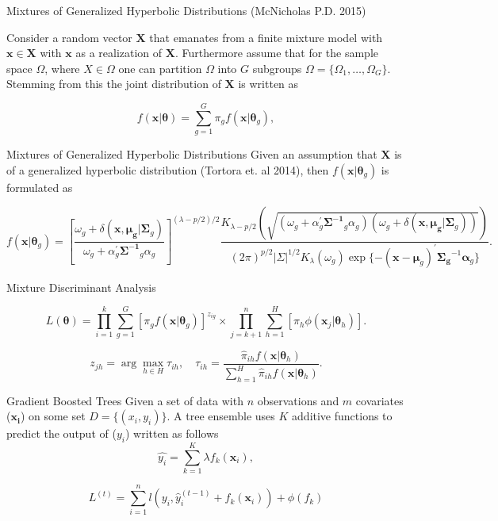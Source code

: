 \documentclass{beamer}
\begin{document}
\begin{frame}{Mixtures of Generalized Hyperbolic Distributions (McNicholas P.D. 2015) }

Consider a random vector $\bm{X}$ that emanates from a finite mixture model with $\bm{x} \in \bm{X}$ with $\bm{x}$ as a realization of $ \bm{X}$. Furthermore assume that for the sample space $\Omega$, where $X \in \Omega$ one can partition $\Omega$ into $G$ subgroups $\Omega = \{\Omega_1, \dots ,\Omega_G \}$. Stemming from this the joint distribution of $\bm{X}$ is written as

$$f(\bm{x}| \bm{\theta}) = \sum_{g = 1}^G \pi_g f(\bm{x}| \bm{\theta}_g), $$


\end{frame}


\begin{frame}{Mixtures of Generalized Hyperbolic Distributions}
Given an assumption that $\bm{X}$ is of a generalized hyperbolic distribution (Tortora et. al 2014), then $f(\bm{x}| \bm{\theta}_g)$ is formulated as 
\begin{tiny}
$$ f (\bm{x}| \bm{\theta}_g) = \left[ \frac{ \omega_g + \delta(  \bm{x}, \bm{\mu_g} | \bm{\Sigma}_g  )     }{ \omega_g +  \alpha^{'}_g \bm{\Sigma^{-1}}_g \alpha_g  }\right]^{(\lambda - p/2)/2} \frac{K_{\lambda - p/2} \left( \sqrt{ (\omega_g +  \alpha^{'}_g \bm{\Sigma^{-1}}_g \alpha_g ) (  \omega_g + \delta(  \bm{x}, \bm{\mu_g} | \bm{\Sigma}_g  ))   }    \right)    }{(2 \pi)^{p/2} |\Sigma|^{1/2} K_\lambda(\omega_g) \exp\{ - ( \bm{x} - \bm{\mu}_g)^{'} \bm{\Sigma_g}^{-1} \bm{\alpha}_g\}  } .   $$ 
\end{tiny}
\end{frame}


\begin{frame}{Mixture Discriminant Analysis}

$$L(\bm{\theta}) =   \prod_{i=1}^k \sum_{g=1}^G \left[  \pi_g f(\bm{x}| \bm{\theta}_g) \right]^{z_{ig}} \times \prod_{j=k+1}^n \sum_{h=1}^H \left[\pi_h\phi(\bm{x}_j| \bm{\theta}_h) \right].$$


$$z_{jh} = \arg \max_{h \in H} \tau_{ih}  , \quad \tau_{ih} = \frac{\hat{\pi}_{ih}  f(\bm{x}| \bm{\theta}_h)  }{ \sum_{h=1}^H \hat{\pi}_{ih}  f(\bm{x}| \bm{\theta}_h) }. $$


\end{frame}


\begin{frame}{Gradient Boosted Trees}
Given a set of data with $n$ observations and $m$ covariates ($\bm{x_i}$) on some set $D = \{ (x_i,y_i) \}$. A tree ensemble uses $K$ additive functions to predict the output of ($y_i$) written as follows 
$$ \hat{y_i}  = \sum_{k=1}^K \lambda f_k(\bm{x}_i), $$ 

$$L^{(t)} = \sum_{i=1}^n l(y_i, \hat{y}^{(t-1)}_i + f_k(\bm{x}_i)) + \phi(f_k) $$

\end{frame}
\end{document}
